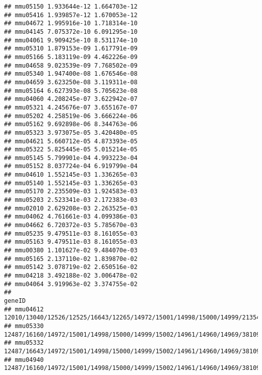 \documentclass[
]{article}
\begin{document}
\begin{verbatim}
## mmu05150 1.933644e-12 1.664703e-12
## mmu05416 1.939857e-12 1.670053e-12
## mmu04672 1.995916e-10 1.718314e-10
## mmu04145 7.075372e-10 6.091295e-10
## mmu04061 9.909425e-10 8.531174e-10
## mmu05310 1.879153e-09 1.617791e-09
## mmu05166 5.183119e-09 4.462226e-09
## mmu04658 9.023539e-09 7.768502e-09
## mmu05340 1.947400e-08 1.676546e-08
## mmu04659 3.623250e-08 3.119311e-08
## mmu05164 6.627393e-08 5.705623e-08
## mmu04060 4.208245e-07 3.622942e-07
## mmu05321 4.245676e-07 3.655167e-07
## mmu05202 4.258519e-06 3.666224e-06
## mmu05162 9.692898e-06 8.344763e-06
## mmu05323 3.973075e-05 3.420480e-05
## mmu04621 5.660712e-05 4.873393e-05
## mmu05322 5.825445e-05 5.015214e-05
## mmu05145 5.799901e-04 4.993223e-04
## mmu05152 8.037724e-04 6.919799e-04
## mmu04610 1.552145e-03 1.336265e-03
## mmu05140 1.552145e-03 1.336265e-03
## mmu05170 2.235509e-03 1.924583e-03
## mmu05203 2.523341e-03 2.172383e-03
## mmu02010 2.629208e-03 2.263525e-03
## mmu04062 4.761661e-03 4.099386e-03
## mmu04662 6.720372e-03 5.785670e-03
## mmu05235 9.479511e-03 8.161055e-03
## mmu05163 9.479511e-03 8.161055e-03
## mmu00380 1.101627e-02 9.484070e-03
## mmu05165 2.137110e-02 1.839870e-02
## mmu05142 3.078719e-02 2.650516e-02
## mmu04218 3.492188e-02 3.006478e-02
## mmu04064 3.919963e-02 3.374755e-02
##                                                                                                                                                                                                                                                                         geneID
## mmu04612                                                       12010/13040/12526/12525/16643/12265/14972/15001/14998/15000/14999/21354/21355/15002/14961/14960/14969/381091/15511/193740/15006/15013/15015/110557/15018/110558/15039/100529082/15024/630294/667977/14990/16149
## mmu05330                                                                                                              12487/16160/14972/15001/14998/15000/14999/15002/14961/14960/14969/381091/15006/15013/15015/110557/15018/110558/15039/100529082/15024/630294/667977/14990
## mmu05332                                                                                                              12487/16643/14972/15001/14998/15000/14999/15002/14961/14960/14969/381091/15006/15013/15015/110557/15018/110558/15039/100529082/15024/630294/667977/14990
## mmu04940                                                                                                              12487/16160/14972/15001/14998/15000/14999/15002/14961/14960/14969/381091/15006/15013/15015/110557/15018/110558/15039/100529082/15024/630294/667977/14990

\end{verbatim}
\end{document}
